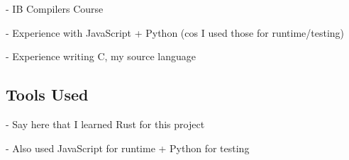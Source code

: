 \documentclass[00-main.tex]{subfiles}
\begin{document}
\begin{Comment}
- IB Compilers Course

- Experience with JavaScript + Python (cos I used those for runtime/testing)

- Experience writing C, my source language
\end{Comment}

\subsection{Tools Used}

\begin{Comment}
- Say here that I learned Rust for this project

- Also used JavaScript for runtime + Python for testing
\end{Comment}
\end{document}
